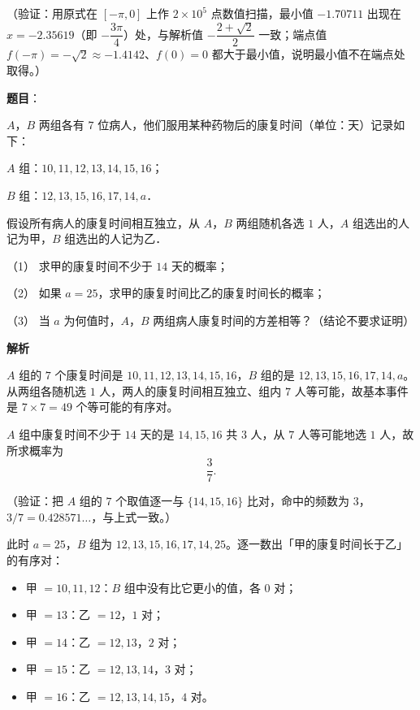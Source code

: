 \begin{answer}
（验证：用原式在 \([-\pi,0]\) 上作 \(2\times10^{5}\) 点数值扫描，最小值 \(-1.70711\) 出现在 \(x=-2.35619\)（即 \(-\dfrac{3\pi}{4}\)）处，与解析值 \(-\dfrac{2+\sqrt{2}}{2}\) 一致；端点值 \(f(-\pi)=-\sqrt{2}\approx-1.4142\)、\(f(0)=0\) 都大于最小值，说明最小值不在端点处取得。）



\end{answer}
\begin{answer}

\textbf{题目}：

\(A\)，\(B\) 两组各有 \(7\) 位病人，他们服用某种药物后的康复时间（单位：天）记录如下：

\(A\) 组：\(10, 11, 12, 13, 14, 15, 16\)；

\(B\) 组：\(12, 13, 15, 16, 17, 14, a\)．

假设所有病人的康复时间相互独立，从 \(A\)，\(B\) 两组随机各选 \(1\) 人，\(A\) 组选出的人记为甲，\(B\) 组选出的人记为乙．

（1） 求甲的康复时间不少于 \(14\) 天的概率；

（2） 如果 \(a=25\)，求甲的康复时间比乙的康复时间长的概率；

（3） 当 \(a\) 为何值时，\(A\)，\(B\) 两组病人康复时间的方差相等？（结论不要求证明）

\textbf{解析}

\(A\) 组的 \(7\) 个康复时间是 \(10,11,12,13,14,15,16\)，\(B\) 组的是 \(12,13,15,16,17,14,a\)。从两组各随机选 \(1\) 人，两人的康复时间相互独立、组内 \(7\) 人等可能，故基本事件是 \(7\times7=49\) 个等可能的有序对。


\(A\) 组中康复时间不少于 \(14\) 天的是 \(14,15,16\) 共 \(3\) 人，从 \(7\) 人等可能地选 \(1\) 人，故所求概率为
\nopagebreak[4]
\[
\frac{3}{7}.
\]

（验证：把 \(A\) 组的 \(7\) 个取值逐一与 \(\{14,15,16\}\) 比对，命中的频数为 \(3\)，\(3/7=0.428571\ldots\)，与上式一致。）


此时 \(a=25\)，\(B\) 组为 \(12,13,15,16,17,14,25\)。逐一数出「甲的康复时间长于乙」的有序对：

\begin{itemize}
\item 甲 \(=10,11,12\)：\(B\) 组中没有比它更小的值，各 \(0\) 对；
\item 甲 \(=13\)：乙 \(=12\)，\(1\) 对；
\item 甲 \(=14\)：乙 \(=12,13\)，\(2\) 对；
\item 甲 \(=15\)：乙 \(=12,13,14\)，\(3\) 对；
\item 甲 \(=16\)：乙 \(=12,13,14,15\)，\(4\) 对。
\end{itemize}


\end{answer}
